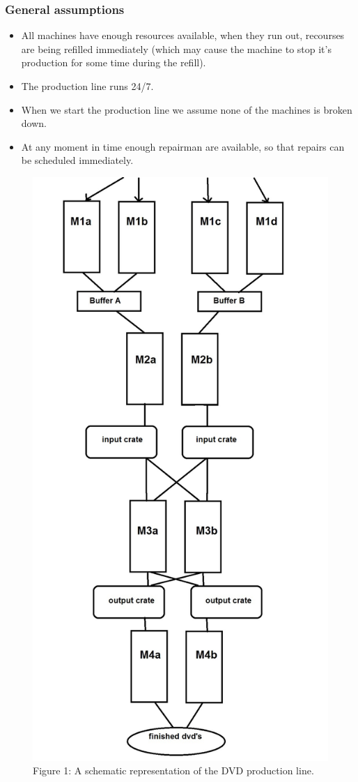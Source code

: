\documentclass[11pt,a4paper]{article}
\begin{document}
\subsubsection{General assumptions}
\begin{itemize}
\item All machines have enough resources available, when they run out, recourses are being refilled immediately (which may cause the machine to stop it's production for some time during the refill).
\item The production line runs 24/7.
\item When we start the production line we assume none of the machines is broken down.
\item At any moment in time enough repairman are available, so that repairs can be scheduled immediately. 
\end{itemize}

\begin{figure}[H]
\centering
\includegraphics[height = 600 pt]{schemaPL.jpg}
\caption{Figure 1: A schematic representation of the DVD production line.}
\end{figure}
\end{document}
